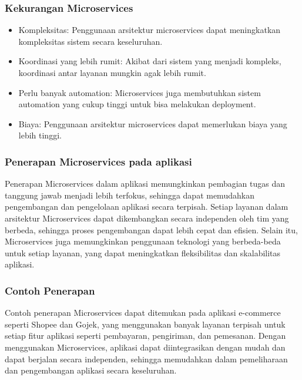 \documentclass{beamer}
\begin{document}
	\begin{frame}
		\frametitle{Kekurangan Microservices}
		\begin{itemize}
			\item Kompleksitas: Penggunaan arsitektur microservices dapat meningkatkan kompleksitas sistem secara keseluruhan.
			\item Koordinasi yang lebih rumit: Akibat dari sistem yang menjadi kompleks, koordinasi antar layanan mungkin agak lebih rumit.
			\item Perlu banyak automation: Microservices juga membutuhkan sistem automation yang cukup tinggi untuk bisa melakukan deployment.
			\item Biaya: Penggunaan arsitektur microservices dapat memerlukan biaya yang lebih tinggi.
		\end{itemize}
	\end{frame}
	
	\begin{frame}
		\frametitle{Penerapan Microservices pada aplikasi}
		Penerapan Microservices dalam aplikasi memungkinkan pembagian tugas dan tanggung jawab menjadi lebih terfokus, sehingga dapat memudahkan pengembangan dan pengelolaan aplikasi secara terpisah. Setiap layanan dalam arsitektur Microservices dapat dikembangkan secara independen oleh tim yang berbeda, sehingga proses pengembangan dapat lebih cepat dan efisien. Selain itu, Microservices juga memungkinkan penggunaan teknologi yang berbeda-beda untuk setiap layanan, yang dapat meningkatkan fleksibilitas dan skalabilitas aplikasi.
	\end{frame}
	
	\begin{frame}
		\frametitle{Contoh Penerapan}
		Contoh penerapan Microservices dapat ditemukan pada aplikasi e-commerce seperti Shopee dan Gojek, yang menggunakan banyak layanan terpisah untuk setiap fitur aplikasi seperti pembayaran, pengiriman, dan pemesanan. Dengan menggunakan Microservices, aplikasi dapat diintegrasikan dengan mudah dan dapat berjalan secara independen, sehingga memudahkan dalam pemeliharaan dan pengembangan aplikasi secara keseluruhan.
	\end{frame}
	
\end{document}
